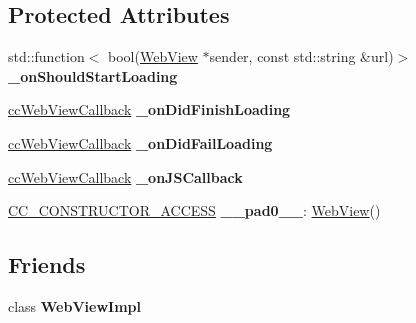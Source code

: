 \subsection*{Protected Attributes}
\begin{DoxyCompactItemize}
\item 
\mbox{\label{classexperimental_1_1ui_1_1WebView_ae18197f074f4692ee04b57c1830d21e9}} 
std\+::function$<$ bool(\hyperlink{classexperimental_1_1ui_1_1WebView}{Web\+View} $\ast$sender, const std\+::string \&url)$>$ {\bfseries \+\_\+on\+Should\+Start\+Loading}
\item 
\mbox{\label{classexperimental_1_1ui_1_1WebView_a420c59d4ca37ebd1698267c6c44827f5}} 
\hyperlink{classexperimental_1_1ui_1_1WebView_a11ddd376a5996eff614857f236b2b69d}{cc\+Web\+View\+Callback} {\bfseries \+\_\+on\+Did\+Finish\+Loading}
\item 
\mbox{\label{classexperimental_1_1ui_1_1WebView_aee4b536b742eef462ecb7c251f4c725b}} 
\hyperlink{classexperimental_1_1ui_1_1WebView_a11ddd376a5996eff614857f236b2b69d}{cc\+Web\+View\+Callback} {\bfseries \+\_\+on\+Did\+Fail\+Loading}
\item 
\mbox{\label{classexperimental_1_1ui_1_1WebView_a9d5f2d273723aa0126d76f1075bc8c6d}} 
\hyperlink{classexperimental_1_1ui_1_1WebView_a11ddd376a5996eff614857f236b2b69d}{cc\+Web\+View\+Callback} {\bfseries \+\_\+on\+J\+S\+Callback}
\item 
\mbox{\label{classexperimental_1_1ui_1_1WebView_a542117595243e2277b87d0f951a74379}} 
\hyperlink{_2cocos2d_2cocos_2base_2ccConfig_8h_a25ef1314f97c35a2ed3d029b0ead6da0}{C\+C\+\_\+\+C\+O\+N\+S\+T\+R\+U\+C\+T\+O\+R\+\_\+\+A\+C\+C\+E\+SS} {\bfseries \+\_\+\+\_\+pad0\+\_\+\+\_\+}\+: \hyperlink{classexperimental_1_1ui_1_1WebView}{Web\+View}()
\end{DoxyCompactItemize}
\subsection*{Friends}
\begin{DoxyCompactItemize}
\item 
\mbox{\label{classexperimental_1_1ui_1_1WebView_aa948845978efc7a85813d14e9c4616bf}} 
class {\bfseries Web\+View\+Impl}
\end{DoxyCompactItemize}


